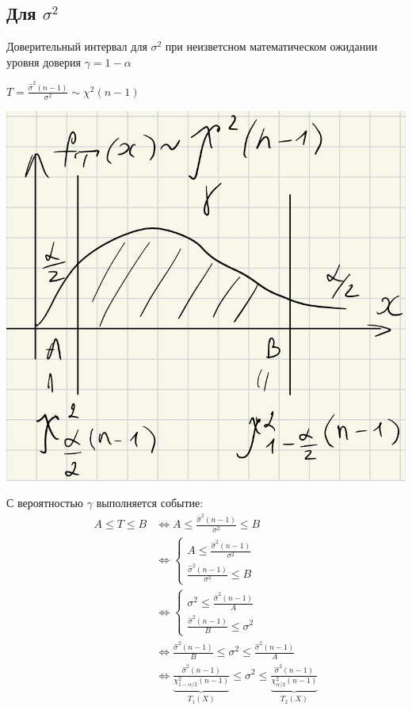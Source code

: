\documentclass{article}
\begin{document}
\subsection{Для $\sigma^2$}
Доверительный интервал для $\sigma^2$ при неизветсном математическом ожидании уровня доверия $\gamma=1-\alpha$

$T=\displaystyle\frac{\widehat{\sigma}^2(n-1)}{\sigma^2}\sim\chi^2(n-1)$

\begin{center}
    \includegraphics[width=0.5\linewidth]{confidence_interval2.png}
\end{center}
С вероятностью $\gamma$ выполняется событие:
\begin{equation*}
    \begin{aligned}
        A\leqslant T\leqslant B&\Longleftrightarrow A\leqslant \frac{\widehat{\sigma}^2(n-1)}{\sigma^2}\leqslant B\\
        &\Longleftrightarrow \begin{cases}
            A\leqslant\frac{\widehat{\sigma}^2(n-1)}{\sigma^2}\\
            \frac{\widehat{\sigma}^2(n-1)}{\sigma^2}\leqslant B
        \end{cases}\\
        &\Longleftrightarrow\begin{cases}
            \sigma^2\leqslant\frac{\widehat{\sigma}^2(n-1)}{A}\\
            \frac{\widehat{\sigma}^2(n-1)}{B}\leqslant\sigma^2
        \end{cases}\\
        &\Longleftrightarrow\frac{\widehat{\sigma}^2(n-1)}{B}\leqslant\sigma^2\leqslant\frac{\widehat{\sigma}^2(n-1)}{A}\\
        &\Longleftrightarrow\underbrace{\frac{\widehat{\sigma}^2(n-1)}{\chi^2_{1-\alpha/2}(n-1)}}_{T_1(X)}\leqslant\sigma^2\leqslant\underbrace{\frac{\widehat{\sigma}^2(n-1)}{\chi^2_{\alpha/2}(n-1)}}_{T_2(X)}
    \end{aligned}
\end{equation*}
\end{document}

